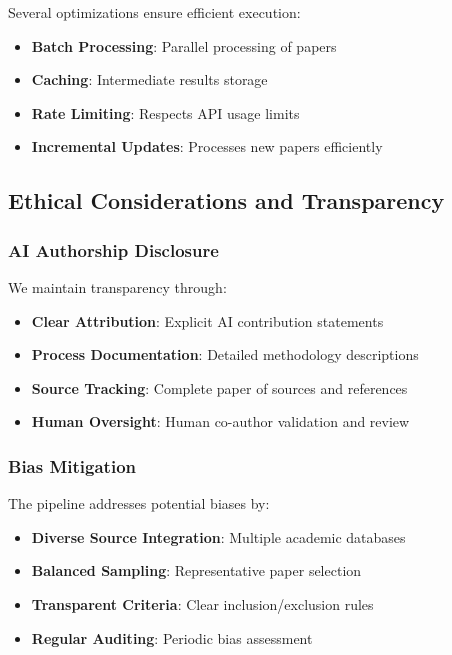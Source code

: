 Several optimizations ensure efficient execution:
\begin{itemize}
    \item \textbf{Batch Processing}: Parallel processing of papers
    \item \textbf{Caching}: Intermediate results storage
    \item \textbf{Rate Limiting}: Respects API usage limits
    \item \textbf{Incremental Updates}: Processes new papers efficiently
\end{itemize}

\subsection{Ethical Considerations and Transparency}

\subsubsection{AI Authorship Disclosure}

We maintain transparency through:
\begin{itemize}
    \item \textbf{Clear Attribution}: Explicit AI contribution statements
    \item \textbf{Process Documentation}: Detailed methodology descriptions
    \item \textbf{Source Tracking}: Complete paper of sources and references
    \item \textbf{Human Oversight}: Human co-author validation and review
\end{itemize}

\subsubsection{Bias Mitigation}

The pipeline addresses potential biases by:
\begin{itemize}
    \item \textbf{Diverse Source Integration}: Multiple academic databases
    \item \textbf{Balanced Sampling}: Representative paper selection
    \item \textbf{Transparent Criteria}: Clear inclusion/exclusion rules
    \item \textbf{Regular Auditing}: Periodic bias assessment
\end{itemize}
